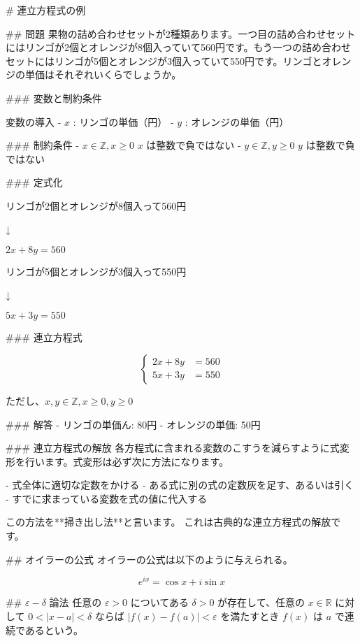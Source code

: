 # 連立方程式の例

## 問題
果物の詰め合わせセットが2種類あります。一つ目の詰め合わせセットにはリンゴが2個とオレンジが8個入っていて560円です。もう一つの詰め合わせセットにはリンゴが5個とオレンジが3個入っていて550円です。リンゴとオレンジの単価はそれぞれいくらでしょうか。

### 変数と制約条件

変数の導入
- $x$ : リンゴの単価（円）
- $y$ : オレンジの単価（円）

### 制約条件
- $x \in \mathbb{Z} , x \geq 0$ $x$ は整数で負ではない
- $y \in \mathbb{Z} , y \geq 0$ $y$ は整数で負ではない

### 定式化

リンゴが2個とオレンジが8個入って560円

↓

$2x + 8y = 560$ 

リンゴが5個とオレンジが3個入って550円

↓

$5x + 3y = 550$ 

### 連立方程式

$$
\begin{cases} 2x + 8y &= 560 \\ 5x + 3y &= 550 \end{cases}
$$

ただし、$x,y \in \mathbb{Z}, x \geq 0, y \geq 0$ 

### 解答
- リンゴの単価ん: 80円
- オレンジの単価: 50円

### 連立方程式の解放
各方程式に含まれる変数のこすうを減らすように式変形を行います。式変形は必ず次に方法になります。

- 式全体に適切な定数をかける
- ある式に別の式の定数灰を足す、あるいは引く
- すでに求まっている変数を式の値に代入する

この方法を**掃き出し法**と言います。
これは古典的な連立方程式の解放です。

## オイラーの公式
オイラーの公式は以下のように与えられる。

$$ e^{i x} = \cos{x} + i \sin{x} $$

##  $\varepsilon - \delta$ 論法
任意の $\varepsilon > 0$ についてある $\delta > 0$ が存在して、任意の $x \in \mathbb{R}$ に対して $0 < |x - a| < \delta$ ならば $|f(x) - f(a)| < \varepsilon$ を満たすとき $f(x)$ は $a$ で連続であるという。
